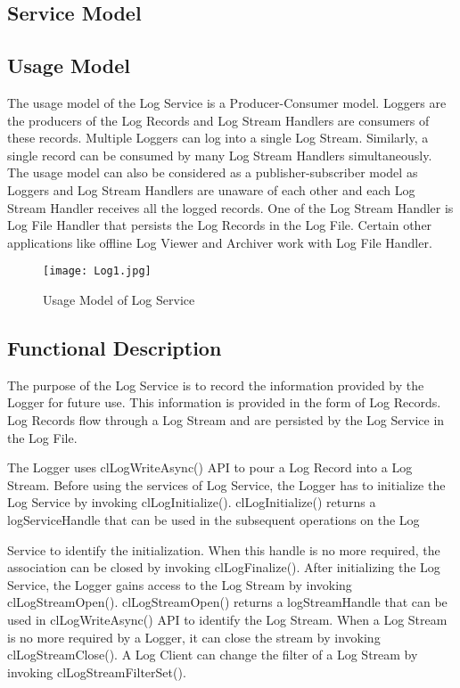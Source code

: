 \begin{flushleft}
\chapter{Service Model}
\section{Usage Model}
The usage model of the Log Service is a Producer-Consumer model. Loggers are the producers of the Log Records and Log Stream Handlers are consumers of 
these records. 
Multiple Loggers can log into a single Log Stream. Similarly, a single record can be consumed by many Log Stream Handlers simultaneously. 
The usage model can also be considered as a publisher-subscriber model as Loggers and Log Stream Handlers are unaware of each other and each Log Stream
Handler receives all the logged records. One of the Log Stream Handler is Log File Handler that persists the Log Records in the Log File. Certain other 
applications like offline Log Viewer and Archiver work with Log File Handler.

\begin{figure}[htp]
\centering
\texttt{[image: Log1.jpg]}
\caption{Usage Model of Log Service}
\end{figure}

\newpage
\section{Functional Description}
The purpose of the Log Service is to record the information provided by the Logger for future use. This information is provided in the form of Log
Records. Log Records flow through a Log Stream and are persisted by the Log Service in the Log File.
\par
The Logger uses clLogWriteAsync() API to pour a Log Record into a Log Stream. Before using the services of Log Service, the Logger has to initialize 
the Log Service by invoking clLogInitialize(). clLogInitialize() returns a logServiceHandle that can be used in the subsequent operations on the Log 
\par
Service to identify the initialization. When this handle is no more required, the association can be closed by invoking clLogFinalize(). 
After initializing the Log Service, the Logger gains access to the Log Stream by invoking clLogStreamOpen(). clLogStreamOpen() returns a 
logStreamHandle that can be used in clLogWriteAsync() API to identify the Log Stream. When a Log Stream is no more required by a Logger, it can 
close the stream by invoking clLogStreamClose(). 
A Log Client can change the filter of a Log Stream by invoking clLogStreamFilterSet().



\end{flushleft}
